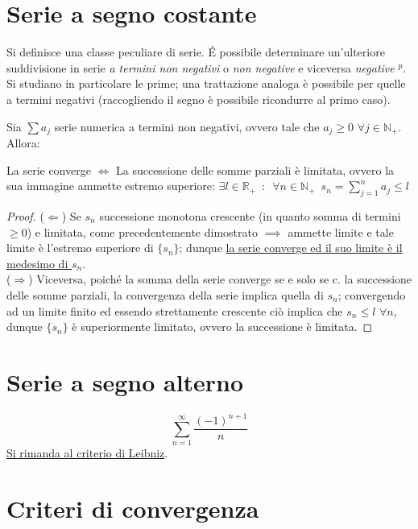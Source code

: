 \documentclass[10pt, oneside]{book}
\theoremstyle{plain}
\begin{document}
\section{Serie a segno costante}
Si definisce una classe peculiare di serie. \'E possibile determinare un'ulteriore suddivisione in serie \textit{a termini non negativi} o \textit{non negative} e viceversa \textit{negative} \hypertarget{posit}{$^p$}. Si studiano in particolare le prime; una trattazione analoga è possibile per quelle a termini negativi (raccogliendo il segno è possibile ricondurre al primo caso).

\begin{ther}
Sia $\sum a_j$ serie numerica a termini non negativi, ovvero tale che $a_j \geq 0$ $\forall j \in \mathbb{N}_+$. Allora:
\begin{center}
    La serie converge $\Longleftrightarrow$ La successione delle somme parziali è limitata, ovvero la sua immagine ammette estremo superiore: $\exists l \in \mathbb{R}_+ \enspace : \enspace \forall n \in \mathbb{N}_+ \enspace s_n = \sum_{j=1}^{n} a_j \leq l$
\end{center}
\end{ther}
\begin{proof}
($\Leftarrow$) Se $s_n$ successione monotona crescente (in quanto somma di termini $\geq 0$) e limitata, come precedentemente dimostrato $\implies$ ammette limite e tale limite è l'estremo superiore di $\{s_n\}$; dunque \hyperlink{sommeparziali}{la serie converge ed il suo limite è il medesimo di $s_n$}.  
\\($\Rightarrow$) Viceversa, poiché la somma della serie converge se e solo se c. la successione delle somme parziali, la convergenza della serie implica quella di $s_n$; convergendo ad un limite finito ed essendo strettamente crescente ciò implica che $s_n \leq l$ $\forall n$, dunque $\{s_n\}$ è superiormente limitato, ovvero la successione è limitata.
\end{proof}

\section{Serie a segno alterno}
\[\sum \limits_{n = 1}^{\infty} \frac{(-1)^{n+1}}{n}\]
\hyperlink{leibniz}{Si rimanda al criterio di Leibniz}.

\section{Criteri di convergenza}
\end{document}
